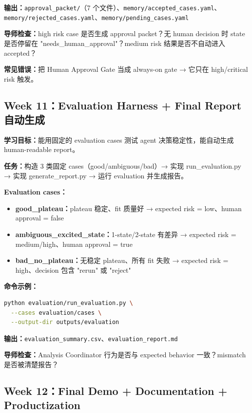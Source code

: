 \documentclass[11pt,a4paper,fontset=fandol]{ctexart}
\begin{document}
\textbf{输出：}\texttt{approval\_packet/}（7 个文件）、\texttt{memory/accepted\_cases.yaml}、\texttt{memory/rejected\_cases.yaml}、\texttt{memory/pending\_cases.yaml}

\textbf{导师检查：}high risk case 是否生成 approval packet？无 human decision 时 state 是否停留在 "needs\_human\_approval"？medium risk 结果是否不自动进入 accepted？

\textbf{常见错误：}把 Human Approval Gate 当成 always-on gate → 它只在 high/critical risk 触发。

\subsection{Week 11：Evaluation Harness + Final Report 自动生成}

\textbf{学习目标：}能用固定的 evaluation cases 测试 agent 决策稳定性，能自动生成 human-readable report。

\textbf{任务：}构造 3 类固定 cases（good/ambiguous/bad）→ 实现 run\_evaluation.py → 实现 generate\_report.py → 运行 evaluation 并生成报告。

\textbf{Evaluation cases：}
\begin{itemize}
  \item \textbf{good\_plateau：}plateau 稳定、fit 质量好 → expected risk = low、human approval = false
  \item \textbf{ambiguous\_excited\_state：}1-state/2-state 有差异 → expected risk = medium/high、human approval = true
  \item \textbf{bad\_no\_plateau：}无稳定 plateau、所有 fit 失败 → expected risk = high、decision 包含 "rerun" 或 "reject"
\end{itemize}

\textbf{命令示例：}
\begin{lstlisting}[language=bash]
python evaluation/run_evaluation.py \
  --cases evaluation/cases \
  --output-dir outputs/evaluation
\end{lstlisting}

\textbf{输出：}\texttt{evaluation\_summary.csv}、\texttt{evaluation\_report.md}

\textbf{导师检查：}Analysis Coordinator 行为是否与 expected behavior 一致？mismatch 是否被清楚报告？

\subsection{Week 12：Final Demo + Documentation + Productization}
\end{document}
